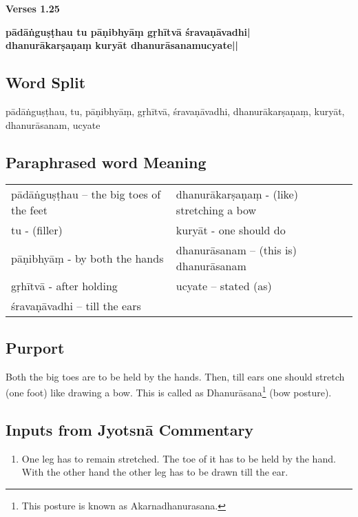 \noindent 
\textbf{Verses 1.25}

\begin{shloka}
\textbf{pādāṅguṣṭhau tu pāṇibhyāṃ gṛhītvā śravaṇāvadhi|}\\
\textbf{dhanurākarṣaṇaṃ kuryāt dhanurāsanamucyate||}
\end{shloka}

\subsection*{Word Split}

pādāṅguṣṭhau, tu, pāṇibhyāṃ, gṛhītvā, śravaṇāvadhi, dhanurā\-karṣa\-ṇaṃ, kuryāt, dhanurāsanam, ucyate

\subsection*{Paraphrased word Meaning}

\begin{longtable}{>{\noindent\raggedright}p{5cm}>{\noindent\raggedright}p{5cm}}
pādāṅguṣṭhau – the big toes of the feet  & dhanurākarṣaṇaṃ - (like) stretching a bow \tabularnewline
tu  - (filler)  & kuryāt  - one should do\tabularnewline
pāṇibhyāṃ - by both the hands  & dhanurāsanam – (this is) dhanurāsanam\tabularnewline
gṛhītvā  - after holding  & ucyate – stated (as)\tabularnewline
śravaṇāvadhi – till the ears & 
\end{longtable}

\subsection*{Purport}

Both the big toes are to be held by the hands. Then, till ears one should stretch (one foot)  like drawing a bow. This is called as Dhanurāsana\footnote{This posture is known as Akarnadhanurasana.} (bow posture).

\subsection*{Inputs from Jyotsnā Commentary}

\begin{enumerate}
\item One leg has to remain stretched. The toe of it has to be held by the hand.  With the other hand the other leg has to be drawn till the ear. 
\end{enumerate}

